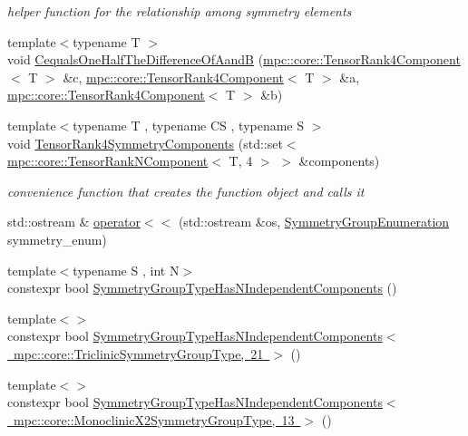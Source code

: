 \begin{DoxyCompactItemize}
\begin{DoxyCompactList}\small\item\em helper function for the relationship among symmetry elements \end{DoxyCompactList}\item 
{\footnotesize template$<$typename T $>$ }\\void \mbox{\hyperlink{namespacempc_1_1core_a7edf6d265fbe6e64e7d5065629b2cb56}{Cequals\+One\+Half\+The\+Difference\+Of\+AandB}} (\mbox{\hyperlink{namespacempc_1_1core_ac3a232afc7c680d580628e834030482f}{mpc\+::core\+::\+Tensor\+Rank4\+Component}}$<$ T $>$ \&c, \mbox{\hyperlink{namespacempc_1_1core_ac3a232afc7c680d580628e834030482f}{mpc\+::core\+::\+Tensor\+Rank4\+Component}}$<$ T $>$ \&a, \mbox{\hyperlink{namespacempc_1_1core_ac3a232afc7c680d580628e834030482f}{mpc\+::core\+::\+Tensor\+Rank4\+Component}}$<$ T $>$ \&b)
\item 
{\footnotesize template$<$typename T , typename CS , typename S $>$ }\\void \mbox{\hyperlink{namespacempc_1_1core_a1b8ea597fa8c5cacc9f51dc5bcf18809}{Tensor\+Rank4\+Symmetry\+Components}} (std\+::set$<$ \mbox{\hyperlink{classmpc_1_1core_1_1_tensor_rank_n_component}{mpc\+::core\+::\+Tensor\+Rank\+N\+Component}}$<$ T, 4 $>$ $>$ \&components)
\begin{DoxyCompactList}\small\item\em convenience function that creates the function object and calls it \end{DoxyCompactList}\item 
std\+::ostream \& \mbox{\hyperlink{namespacempc_1_1core_a372993ccd0fbeaef1367f7266160da4a}{operator$<$$<$}} (std\+::ostream \&os, \mbox{\hyperlink{namespacempc_1_1core_a9d979684062547055a0ef5c13077bad8}{Symmetry\+Group\+Enumeration}} symmetry\+\_\+enum)
\item 
{\footnotesize template$<$typename S , int N$>$ }\\constexpr bool \mbox{\hyperlink{namespacempc_1_1core_a4fc1927e7fe7eb577a6bef4ab6bfb4e4}{Symmetry\+Group\+Type\+Has\+N\+Independent\+Components}} ()
\item 
{\footnotesize template$<$$>$ }\\constexpr bool \mbox{\hyperlink{namespacempc_1_1core_a8fb7f012a089de353f204505a594e737}{Symmetry\+Group\+Type\+Has\+N\+Independent\+Components$<$ mpc\+::core\+::\+Triclinic\+Symmetry\+Group\+Type, 21 $>$}} ()
\item 
{\footnotesize template$<$$>$ }\\constexpr bool \mbox{\hyperlink{namespacempc_1_1core_a7a87a87ba663c97dca99de2c658e78ac}{Symmetry\+Group\+Type\+Has\+N\+Independent\+Components$<$ mpc\+::core\+::\+Monoclinic\+X2\+Symmetry\+Group\+Type, 13 $>$}} ()

\end{DoxyCompactItemize}
